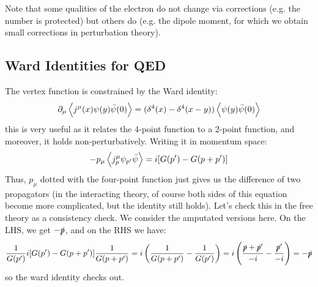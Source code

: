 Note that some qualities of the electron do not change via corrections (e.g. the number is protected) but others do (e.g. the dipole moment, for which we obtain small corrections in perturbation theory).

\subsection{Ward Identities for QED}
The vertex function is constrained by the Ward identity:
\begin{equation}
    \partial_\mu \left< j^\mu(x)\psi(y)\bar{\psi}(0) \right> = (\delta^4(x) - \delta^4(x-y))\left< \psi(y)\bar{\psi}(0) \right>
\end{equation}
this is very useful as it relates the 4-point function to a 2-point function, and moreover, it holds non-perturbatively. Writing it in momentum space:
\begin{equation}
    -p_\mu \left< j^\mu_p \psi_{p'}\bar{\psi} \right> = i[G(p') - G(p + p')]
\end{equation}
Thus, $p_\mu$ dotted with the four-point function just gives us the difference of two propagators (in the interacting theory, of course both sides of this equation become more complicated, but the identity still holds). Let's check this in the free theory as a consistency check. We consider the amputated versions here. On the LHS, we get $-\slashed{p}$, and on the RHS we have:
\begin{equation}
    \frac{1}{G(p')}i[G(p') - G(p + p')]\frac{1}{G(p+p')} = i\left(\frac{1}{G(p+p')} - \frac{1}{G(p')}\right) = i\left(\frac{\slashed{p} + \slashed{p}'}{-i} - \frac{\slashed{p}'}{-i}\right) = -\slashed{p}
\end{equation}
so the ward identity checks out.


